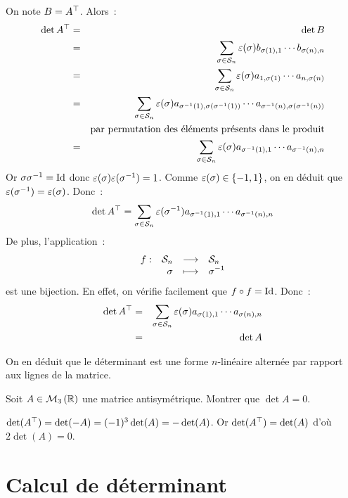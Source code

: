 \documentclass{magnolia}
\begin{document}
\begin{preuve}
On note $B={A}^{\top}$. Alors~:
\begin{eqnarray*}
\det\trans{A}
&=& \det B\\
&=& \sum_{\sigma\in\gsym{n}} \signat{\sigma}b_{\sigma\p{1},1}\cdots b_{\sigma(n),n}\\
&=& \sum_{\sigma\in\gsym{n}} \signat{\sigma}a_{1,\sigma\p{1}}\cdots a_{n,\sigma(n)}\\
&=& \sum_{\sigma\in\gsym{n}}\signat{\sigma}a_{\sigma^{-1}\p{1},\sigma\p{\sigma^{-1}\p{1}}}
          \cdots a_{\sigma^{-1}(n),\sigma\p{\sigma^{-1}(n)}}\\
& & \text{par permutation des éléments présents dans le produit}\\
&=& \sum_{\sigma\in\gsym{n}}\signat{\sigma}a_{\sigma^{-1}\p{1},1}
          \cdots a_{\sigma^{-1}(n),n}
\end{eqnarray*}
Or $\sigma\sigma^{-1}=\operatorname{Id}$ donc $\signat{\sigma}\signat{\sigma^{-1}}=1$. Comme
$\signat{\sigma}\in\ens{-1,1}$, on en déduit que
$\signat{\sigma^{-1}}=\signat{\sigma}$. Donc~:
\[\det\trans{A}=\sum_{\sigma\in\gsym{n}}\signat{\sigma^{-1}}a_{\sigma^{-1}\p{1},1}
          \cdots a_{\sigma^{-1}(n),n}\]
De plus, l'application~:
\[\begin{array}[t]{lrcl} \displaystyle{f} : & \displaystyle{\mathcal{S}_{n}} & \longrightarrow & \displaystyle{\mathcal{S}_{n}} \\ & \displaystyle{\sigma} & \longmapsto & \displaystyle{\sigma^{-1}} \end{array}\]
est une bijection. En effet, on vérifie facilement que $f\circ f=\operatorname{Id}$. Donc~:
\begin{eqnarray*}
\det\trans{A}
&=& \sum_{\sigma\in\gsym{n}}\signat{\sigma}a_{\sigma\p{1},1} \cdots a_{\sigma(n),n}\\
&=& \det A
\end{eqnarray*}
\end{preuve}

\begin{remarqueUnique}
\remarque On en déduit que le déterminant est une forme $n$-linéaire alternée par
  rapport aux lignes de la matrice.
\end{remarqueUnique}
\vspace{2ex}
\begin{exoUnique}
\exo Soit $A\in\mathcal{M}_{3}\left(\mathbb{R}\right)$ une matrice antisymétrique. Montrer que
  $\det A=0$.
\end{exoUnique}

\begin{sol}
$\mathop{\rm det}({A}^{\top})=\mathop{\rm det}(-A)=(-1)^3\mathop{\rm det}(A)=-\mathop{\rm det}(A)$. Or $\mathop{\rm det}({A}^{\top})=\mathop{\rm det}(A)$ d'où $2\det(A)=0$.
\end{sol}

\section{Calcul de déterminant}
\end{document}
